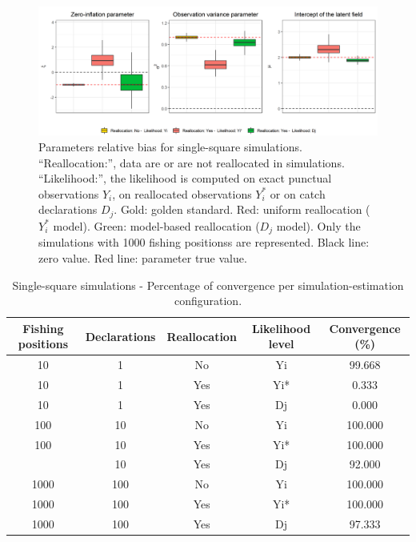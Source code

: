 \documentclass[
  english,
  man,floatsintext]{apa6}
\begin{document}
\begin{figure}
\centering
\includegraphics{images/par_plot_single_square.png}
\caption{\label{fig:ParBiasSingle} Parameters relative bias for single-square simulations. \enquote{Reallocation:}, data are or are not reallocated in simulations. \enquote{Likelihood:}, the likelihood is computed on exact punctual observations \(Y_i\), on reallocated observations \(Y_i^*\) or on catch declarations \(D_j\). Gold: golden standard. Red: uniform reallocation (\(Y_i^*\) model). Green: model-based reallocation (\(D_j\) model). Only the simulations with 1000 fishing positionss are represented. Black line: zero value. Red line: parameter true value.}
\end{figure}

\begin{table}

\caption{\label{tab:unnamed-chunk-5}Single-square simulations - Percentage of convergence per simulation-estimation configuration.}
\centering
\begin{tabular}[t]{ccccc}
\toprule
Fishing positions & Declarations & Reallocation & Likelihood level & Convergence (\%)\\
\midrule
10 & 1 & No & Yi & 99.668\\
10 & 1 & Yes & Yi* & 0.333\\
10 & 1 & Yes & Dj & 0.000\\
100 & 10 & No & Yi & 100.000\\
100 & 10 & Yes & Yi* & 100.000\\
\addlinespace
100 & 10 & Yes & Dj & 92.000\\
1000 & 100 & No & Yi & 100.000\\
1000 & 100 & Yes & Yi* & 100.000\\
1000 & 100 & Yes & Dj & 97.333\\
\bottomrule
\end{tabular}
\end{table}

\newpage
\end{document}
